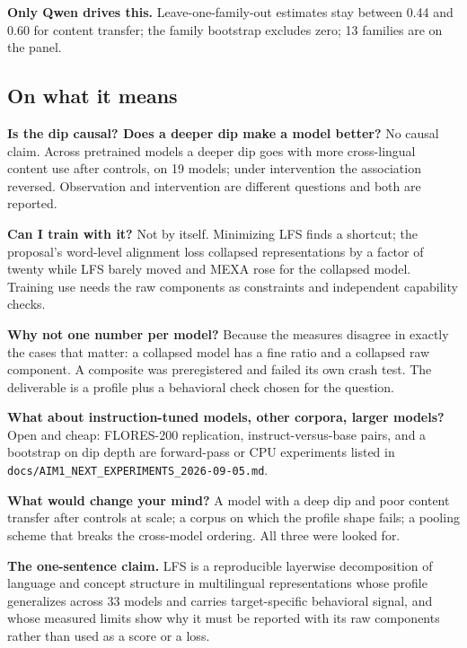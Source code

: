 \textbf{Only Qwen drives this.}
Leave-one-family-out estimates stay between 0.44 and 0.60 for content
transfer; the family bootstrap excludes zero; 13 families are on the panel.

\subsection*{On what it means}

\textbf{Is the dip causal? Does a deeper dip make a model better?}
No causal claim. Across pretrained models a deeper dip goes with more
cross-lingual content use after controls, on 19 models; under intervention
the association reversed. Observation and intervention are different
questions and both are reported.

\textbf{Can I train with it?}
Not by itself. Minimizing LFS finds a shortcut; the proposal's word-level
alignment loss collapsed representations by a factor of twenty while LFS
barely moved and MEXA rose for the collapsed model. Training use needs
the raw components as constraints and independent capability checks.

\textbf{Why not one number per model?}
Because the measures disagree in exactly the cases that matter: a collapsed
model has a fine ratio and a collapsed raw component. A composite was
preregistered and failed its own crash test. The deliverable is a profile
plus a behavioral check chosen for the question.

\textbf{What about instruction-tuned models, other corpora, larger models?}
Open and cheap: FLORES-200 replication, instruct-versus-base pairs, and a
bootstrap on dip depth are forward-pass or CPU experiments listed in
\texttt{docs/AIM1\_NEXT\_EXPERIMENTS\_2026-09-05.md}.

\textbf{What would change your mind?}
A model with a deep dip and poor content transfer after controls at scale; a
corpus on which the profile shape fails; a pooling scheme that breaks the
cross-model ordering. All three were looked for.

\textbf{The one-sentence claim.}
LFS is a reproducible layerwise decomposition of language and concept
structure in multilingual representations whose profile generalizes across 33
models and carries target-specific behavioral signal, and whose measured
limits show why it must be reported with its raw components rather than used
as a score or a loss.
